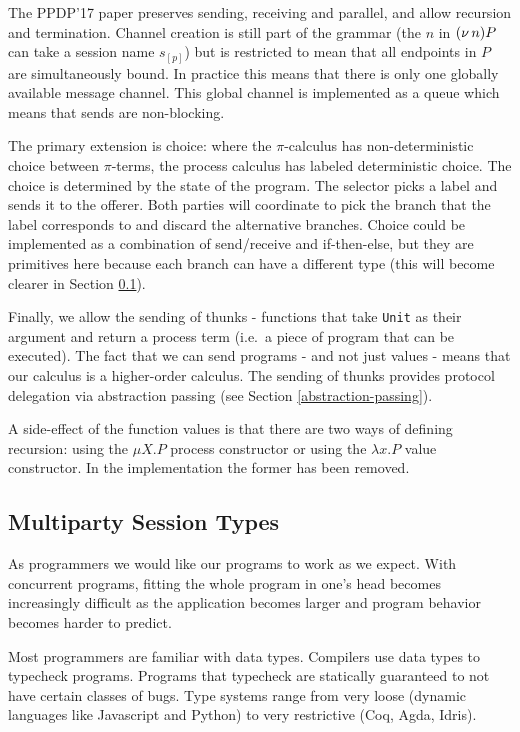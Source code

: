 \documentclass[runningheads,plain]{llncs}
\begin{document}
The PPDP'17 paper preserves sending, receiving and parallel, and allow
recursion and termination. Channel creation is still part of the grammar
(the \(n\) in \((\nu\, n)P\) can take a session name \(s_{[p]}\)) but is
restricted to mean that all endpoints in \(P\) are simultaneously bound.
In practice this means that there is only one globally available message
channel. This global channel is implemented as a queue which means that
sends are non-blocking.

The primary extension is choice: where the \(\pi\)-calculus has
non-deterministic choice between \(\pi\)-terms, the process calculus has
labeled deterministic choice. The choice is determined by the state of
the program. The selector picks a label and sends it to the offerer.
Both parties will coordinate to pick the branch that the label
corresponds to and discard the alternative branches. Choice could be
implemented as a combination of send/receive and if-then-else, but they
are primitives here because each branch can have a different type (this
will become clearer in Section \ref{session-types}).

Finally, we allow the sending of thunks - functions that take
\texttt{Unit} as their argument and return a process term (i.e.~a piece
of program that can be executed). The fact that we can send programs -
and not just values - means that our calculus is a higher-order
calculus. The sending of thunks provides protocol delegation via
abstraction passing (see Section \ref{abstraction-passing}).

A side-effect of the function values is that there are two ways of
defining recursion: using the \(\mu X.P\) process constructor or using
the \(\lambda x.P\) value constructor. In the implementation the former
has been removed.



\subsection{Multiparty Session Types}\label{session-types}

As programmers we would like our programs to work as we expect. With
concurrent programs, fitting the whole program in one's head becomes
increasingly difficult as the application becomes larger and program
behavior becomes harder to predict.

Most programmers are familiar with data types. Compilers use data types
to typecheck programs. Programs that typecheck are statically guaranteed
to not have certain classes of bugs. Type systems range from very loose
(dynamic languages like Javascript and Python) to very restrictive (Coq,
Agda, Idris).
\end{document}
